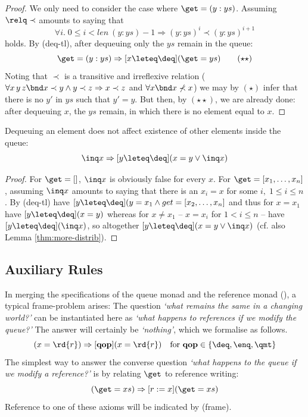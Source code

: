 \begin{proof}
  We only need to consider the case where $\get = (y:ys)$. Assuming $\relq \prec$
  amounts to saying that
\[
\forall i.\; 0\leq i<len\ (y:ys) -1 \Rightarrow (y:ys)^i \prec (y:ys)^{i+1} \tag{$\star$}
\]
holds. By (deq-tl), after dequeuing only the $ys$ remain in the queue:
\[
\get = (y:ys) \Rightarrow [x \leteq \deq](\get = ys) \tag{$\star\star$}
\]
Noting that $\prec$ is a transitive and irreflexive relation (\IE $\forall x\,y\,z\bnd x
\prec y \land y \prec z \Rightarrow x \prec z$ and $\forall x \bnd x \not\prec x$) we may by $(\star)$ infer that there
is no $y'$ in $ys$ such that $y' = y$. But then, by $(\star\star)$, we are already done:
after dequeuing $x$, the $ys$ remain, in which there is no element equal to
$x$. 
\end{proof}

\begin{lem}
\label{inq-deq-eq}
Dequeuing an element does not affect existence of other elements inside the queue: 
\[
\inq x \Rightarrow [y \leteq \deq](x = y \lor \inq x)
\]
\end{lem}

\begin{proof}
  For $\get = []$, $\inq x$ is obviously false for every $x$.  For $\get =
  [x_1,\ldots,x_n]$, assuming $\inq x$ amounts to saying that there is an $x_i = x$
  for some $i,\; 1\leq i\leq n$. By (deq-tl) have $[y \leteq \deq](y = x_1 \land get =
  [x_2,\ldots,x_n]$ and thus for $x = x_1$ have $[y \leteq \deq](x = y)$ whereas for
  $x \neq x_1$ -- \IE $x = x_i$ for $1 < i \leq n$ -- have $[y \leteq \deq](\inq x)$,
  so altogether $[y \leteq \deq](x = y \lor \inq x)$ (cf. also Lemma
  \ref{thm:more-distrib}).
\end{proof}

\subsection{Auxiliary Rules}

In merging the specifications of the queue monad and the reference monad
(\cite{SchroederMossakowski:Hoare}), a typical frame-problem arises: The question \emph{`what
  remains the same in a changing world?'} can be instantiated here as \emph{`what
  happens to references if we modify the queue?'} The answer will certainly be
\emph{`nothing'}, which we formalise as follows.
\begin{equation}
\label{eq:frame1}
(x = \rd{r}) \Rightarrow [\mathbf{qop}](x = \rd{r}) \quad\text{for }\mathbf{qop} \in \{\deq, \enq, \qmt \} 
\end{equation}
The simplest way to answer the converse question \emph{`what happens to the queue
if we modify a reference?'}  is by relating $\get$ to reference writing:
\begin{equation}
\label{eq:frame2}
(\get = xs) \Rightarrow [r := x](\get = xs)
\end{equation}
Reference to one of these axioms will be indicated by (frame).

